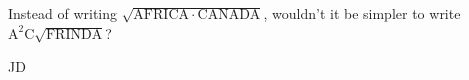 
Instead of writing $ \sqrt{\mathrm{AFRICA} \cdot \mathrm{CANADA}}$, wouldn't it be simpler to write $ \mathrm{A^2C} \sqrt{\mathrm{FRINDA}}$?

JD

